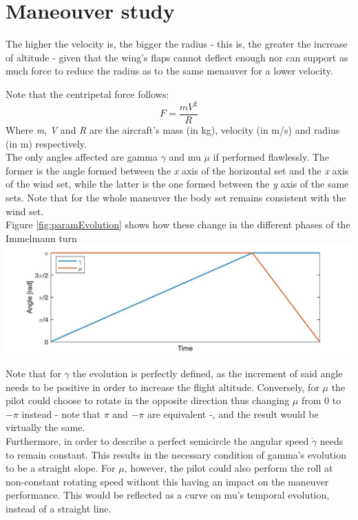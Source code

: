 \section*{Maneouver study}
The higher the velocity is, the bigger the radius - this is, the greater the increase of altitude - given that the wing's flaps cannot deflect enough nor can support as much force to reduce the radius as to the same menauver for a lower velocity.

Note that the centripetal force follows:
\[
F=\frac{mV^2}{R}
\]
Where \textit{m}, \textit{V} and \textit{R} are the aircraft's mass (in kg), velocity (in m/s) and radius (in m) respectively. \\

The only angles affected are gamma $\gamma$ and mu $\mu$ if performed flawlessly. The former is the angle formed between the \textit{x} axis of the horizontal set and the \textit{x} axis of the wind set, while the latter is the one formed between the \textit{y} axis of the same sets. Note that for the whole maneuver the body set remains consistent with the wind set.\\
Figure \ref{fig:paramEvolution} shows how these change in the different phases of the Immelmann turn\\

\includegraphics[width=\linewidth]{../matlab/paramEvolution.jpg}
\label{fig:paramEvolution}
\vspace{0.5cm}

Note that for $\gamma$ the evolution is perfectly defined, as the increment of said angle needs to be positive in order to increase the flight altitude. Conversely, for $\mu$ the pilot could choose to rotate in the opposite direction thus changing $\mu$ from 0 to $-\pi$ instead - note that $\pi$ and $-\pi$ are equivalent -, and the result would be virtually the same.\\
Furthermore, in order to describe a perfect semicircle the angular speed $\dot{\gamma}$ needs to remain constant. This results in the necessary condition of gamma's evolution to be a straight slope. For $\mu$, however, the pilot could also perform the roll at non-constant rotating speed without this having an impact on the maneuver performance. This would be reflected as a curve on mu's temporal evolution, instead of a straight line.\\

